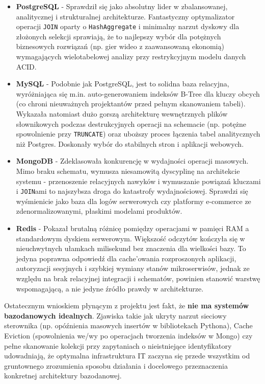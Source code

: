 \begin{itemize}
    \item \textbf{PostgreSQL} - Sprawdził się jako absolutny lider w zbalansowanej, analitycznej i strukturalnej architekturze. Fantastyczny optymalizator operacji \texttt{JOIN} oparty o \texttt{HashAggregate} i minimalny narzut dyskowy dla złożonych selekcji sprawiają, że to najlepszy wybór dla potężnych biznesowych rozwiązań (np. gier wideo z zaawansowaną ekonomią) wymagających wielotabelowej analizy przy restrykcyjnym modelu danych ACID.
    \item \textbf{MySQL} - Podobnie jak PostgreSQL, jest to solidna baza relacyjna, wyróżniająca się m.in. auto-generowaniem indeksów B-Tree dla kluczy obcych (co chroni nieuważnych projektantów przed pełnym skanowaniem tabeli). Wykazała natomiast dużo gorszą architekturę wewnętrznych plików słownikowych podczas destrukcyjnych operacji na schemacie (np. potężne spowolnienie przy \texttt{TRUNCATE}) oraz uboższy proces łączenia tabel analitycznych niż Postgres. Doskonały wybór do stabilnych stron i aplikacji webowych.
    \item \textbf{MongoDB} - Zdeklasowała konkurencję w wydajności operacji masowych. Mimo braku schematu, wymusza niesamowitą dyscyplinę na architekcie systemu - przenoszenie relacyjnych nawyków i wymuszanie powiązań kluczami i \texttt{JOIN}ami to najszybsza droga do katastrofy wydajnościowej. Sprawdzi się wyśmienicie jako baza dla logów serwerowych czy platformy e-commerce ze zdenormalizowanymi, płaskimi modelami produktów.
    \item \textbf{Redis} - Pokazał brutalną różnicę pomiędzy operacjami w pamięci RAM a standardowym dyskiem serwerowym. Większość odczytów kończyła się w nieuchwytnych ułamkach milisekund bez znaczenia dla wielkości bazy. To jedyna poprawna odpowiedź dla cache'owania rozproszonych aplikacji, autoryzacji sesyjnych i szybkiej wymiany stanów mikroserwisów, jednak ze względu na brak relacyjnej integracji i schematów, powinien stanowić warstwę wspomagającą, a nie jedyne źródło prawdy w architekturze.
\end{itemize}

Ostatecznym wnioskiem płynącym z projektu jest fakt, że \textbf{nie ma systemów bazodanowych idealnych}. Zjawiska takie jak ukryty narzut sieciowy sterownika (np. opóźnienia masowych insertów w bibliotekach Pythona), Cache Eviction (spowolnienia we/wy po operacjach tworzenia indeksów w Mongo) czy pełne skanowanie kolekcji przy zapytaniach o nieistniejące identyfikatory udowadniają, że optymalna infrastruktura IT zaczyna się przede wszystkim od gruntownego zrozumienia sposobu działania i docelowego przeznaczenia konkretnej architektury bazodanowej.
